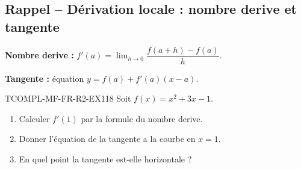 

\subsection*{Rappel -- Dérivation locale : nombre derive et tangente}

\textbf{Nombre derive :} $f'(a) = \lim_{h \to 0} \dfrac{f(a+h) - f(a)}{h}$.

\textbf{Tangente :} équation $y = f(a) + f'(a)(x - a)$.

\begin{exercice}{TCOMPL-MF-FR-R2-EX1}{1}{8}
Soit $f(x) = x^2 + 3x - 1$.
\begin{enumerate}
  \item Calculer $f'(1)$ par la formule du nombre derive.
  \item Donner l'équation de la tangente a la courbe en $x = 1$.
  \item En quel point la tangente est-elle horizontale ?
\end{enumerate}
\end{exercice}

